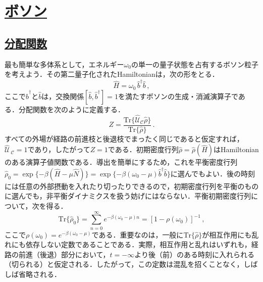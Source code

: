 \documentclass[a4paper,11pt]{ltjsarticle}
\newcommand{\sectionlink}[1]{\section[#1]{\hyperlink{toc}{#1}}}
\newcommand{\subsectionlink}[1]{\subsection[#1]{\hyperlink{toc}{#1}}}
\def\Tr{\mathrm{Tr}}
\begin{document}
\sectionlink{ボソン}\label{sec_bosons}
\subsectionlink{分配関数}\label{sec_bosons-1}


最も簡単な多体系として，エネルギー$\omega_0$の単一の量子状態を占有するボソン粒子を考えよう．その第二量子化されたHamiltonianは，次の形をとる．
\begin{equation}\label{boson-H}
\hat{H} = \omega_0\, \hat{b}^{\dagger} \hat{b}\, ,
\end{equation}ここで$\hat{b}^{\dagger}$と$\hat{b}$は，交換関係$[\hat{b},\hat{b}^{\dagger}]=1$を満たすボソンの生成・消滅演算子である．分配関数を次のように定義する．
\begin{equation}\label{boson-Z}
Z=\frac{\Tr\big\{\hat{\mathcal{U}}_{\mathcal{C}}\hat{\rho}\big\}}{\Tr\{\hat{\rho}\}}\,.
\end{equation}すべての外場が経路の前進枝と後退枝でまったく同じであると仮定すれば，$\hat{\mathcal{U}}_{\ \mathcal{C}}=1$であり，したがって$Z=1$である．初期密度行列$\hat{\rho}=\hat{\rho}(\hat{H})$はHamiltonianのある演算子値関数である．導出を簡単にするため，これを平衡密度行列$\hat{\rho}_0 = \exp\{-\beta(\hat{H}-\mu\hat
{N})\}=\exp\{-\beta(\omega_0-\mu)\hat{b}^\dagger\hat{b}\}$に選んでもよい．後の時刻には任意の外部摂動を入れたり切ったりできるので，初期密度行列を平衡のものに選んでも，非平衡ダイナミクスを扱う妨げにはならない．平衡初期密度行列について，次を得る．
\begin{equation}\label{boson-density-trace}
\Tr\{\hat{\rho}_0\}=\sum\limits_{n=0}^\infty
e^{-\beta(\omega_0-\mu)n}= [1-\rho(\omega_0)]^{-1}\, ,
\end{equation}ここで$\rho(\omega_0)=e^{-\beta(\omega_0-\mu)}$である．重要なのは，一般に$\Tr\{\hat{\rho}\}$が相互作用にも乱れにも依存しない定数であることである．実際，相互作用と乱れはいずれも，経路の前進（後退）部分において，$t=-\infty$より後（前）のある時刻に入れられる（切られる）と仮定される．したがって，この定数は混乱を招くことなく，しばしば省略される．
\end{document}
